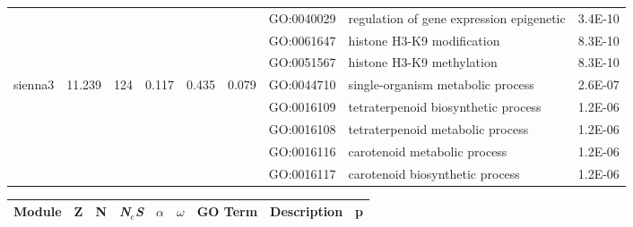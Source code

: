 \documentclass{ut-thesis}
\begin{document}
\begin{landscape}
\begin{table}[ht]
\begin{tabular}{|l|rrrrrlP{5cm}r|}
   &  &  &  &  &  & GO:0040029 & regulation of gene expression epigenetic & 3.4E-10 \\ 
   &  &  &  &  &  & GO:0061647 & histone H3-K9 modification & 8.3E-10 \\ 
   &  &  &  &  &  & GO:0051567 & histone H3-K9 methylation & 8.3E-10 \\ 
\hline  
sienna3 & 11.239 & 124 & 0.117 & 0.435 & 0.079 & GO:0044710 & single-organism metabolic process & 2.6E-07 \\ 
   &  &  &  &  &  & GO:0016109 & tetraterpenoid biosynthetic process & 1.2E-06 \\ 
   &  &  &  &  &  & GO:0016108 & tetraterpenoid metabolic process & 1.2E-06 \\ 
   &  &  &  &  &  & GO:0016116 & carotenoid metabolic process & 1.2E-06 \\ 
   &  &  &  &  &  & GO:0016117 & carotenoid biosynthetic process & 1.2E-06 \\ 
\hline  

\end{tabular}
\end{table}


\begin{table}[ht]
\centering
\begin{tabular}{|l|rrrrrlP{5cm}r|}
  \hline
Module & Z & N & \textit{N$_{e}$S}& $\alpha$ & $\omega$ & GO Term & Description & p \\ 
  \hline


\end{tabular}
\end{table}
\end{landscape}
\end{document}

